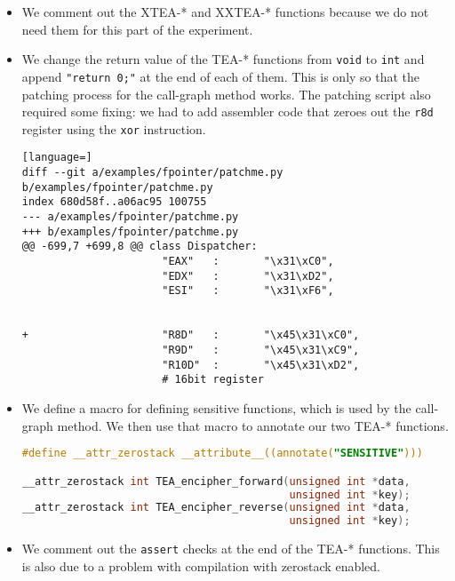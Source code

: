 \documentclass[a4paper,10pt,openright]{memoir}
\newcommand{\code}[1]{\texttt{#1}}
\begin{document}
\begin{itemize}

\item We comment out the XTEA-* and XXTEA-* functions because we do not 
need them for this part of the experiment.

\item We change the return value of the TEA-* functions from 
\code{void} to \code{int} and append \code{"return 0;"} at the end of 
each of them. This is only so that the patching process for the 
call-graph method works. The patching script also required some fixing: 
we had to add assembler code that zeroes out the \code{r8d} register 
using the \code{xor} instruction.

\begin{lstlisting}[language=]
diff --git a/examples/fpointer/patchme.py b/examples/fpointer/patchme.py
index 680d58f..a06ac95 100755
--- a/examples/fpointer/patchme.py
+++ b/examples/fpointer/patchme.py
@@ -699,7 +699,8 @@ class Dispatcher:
                      "EAX"   :       "\x31\xC0",
                      "EDX"   :       "\x31\xD2",
                      "ESI"   :       "\x31\xF6",
                      

+                     "R8D"   :       "\x45\x31\xC0", 
                      "R9D"   :       "\x45\x31\xC9",
                      "R10D"  :       "\x45\x31\xD2",
                      # 16bit register		
\end{lstlisting}

\item We define a macro for defining sensitive functions, which is used 
by the call-graph method. We then use that macro to annotate our two 
TEA-* functions.

\begin{lstlisting}[language=C]
#define __attr_zerostack __attribute__((annotate("SENSITIVE")))

__attr_zerostack int TEA_encipher_forward(unsigned int *data,
                                          unsigned int *key);
__attr_zerostack int TEA_encipher_reverse(unsigned int *data,
                                          unsigned int *key);
\end{lstlisting}

\item We comment out the \code{assert} checks at the end of the TEA-* 
functions. This is also due to a problem with compilation with 
zerostack enabled.

\end{itemize}
\end{document}
